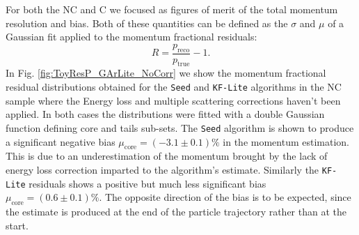 For both the NC and C we focused as figures of merit of the total momentum resolution and bias. Both of these quantities can be defined as the $\sigma$ and $\mu$ of a Gaussian fit applied to the momentum fractional residuals:
\begin{equation}
    \label{eq:MomentumRes}
    R = \frac{p_{\text{reco}}}{p_{\text{true}}} - 1.
\end{equation}
In Fig. \ref{fig:ToyResP_GArLite_NoCorr} we show the momentum fractional residual distributions obtained for the \texttt{Seed} and \texttt{KF-Lite} algorithms in the NC sample where the Energy loss and multiple scattering corrections haven't been applied. In both cases the distributions were fitted with a double Gaussian function defining core and tails sub-sets. The \texttt{Seed} algorithm is shown to produce a significant negative bias $\mu_\text{core}=(-3.1\pm0.1)\%$ in the momentum estimation. This is due to an underestimation of the momentum brought by the lack of energy loss correction imparted to the algorithm's estimate. Similarly the \texttt{KF-Lite} residuals shows a positive but much less significant bias $\mu_\text{core}=(0.6\pm0.1)\%$. The opposite direction of the bias is to be expected, since the estimate is produced at the end of the particle trajectory rather than at the start.

